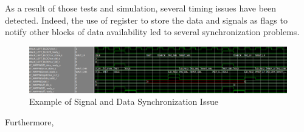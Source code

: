 As a result of those tests and simulation, several timing issues have been detected. Indeed, the use of register to store the data and signals as flags to notify other blocks of data availability led to several synchronization problems. 

\begin{figure}[H]
    \centering
    \hspace*{-30mm}\includegraphics[scale = 0.4]{Figures/lf_timing_issue.png}
    \caption{Example of Signal and Data Synchronization Issue}
    \label{fig:lf_timing}
\end{figure}

Furthermore, 